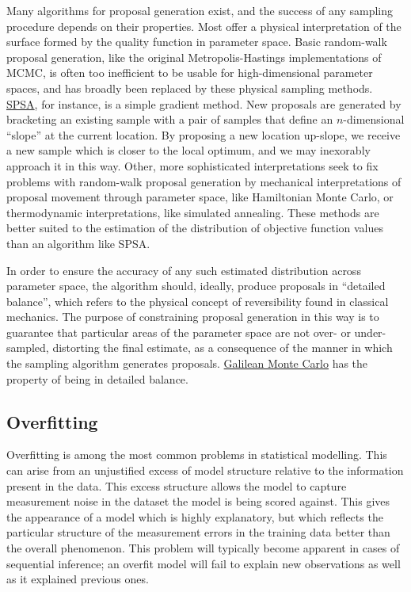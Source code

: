 Many algorithms for proposal generation exist, and the success of any sampling procedure depends on their properties. Most offer a physical interpretation of the surface formed by the quality function in parameter space. Basic random-walk proposal generation, like the original Metropolis-Hastings implementations of MCMC, is often too inefficient to be usable for high-dimensional parameter spaces, and has broadly been replaced by these physical sampling methods. \hyperref[ssec:SPSA]{SPSA}, for instance, is a simple gradient method. New proposals are generated by bracketing an existing sample with a pair of samples that define an $n$-dimensional ``slope'' at the current location. By proposing a new location up-slope, we receive a new sample which is closer to the local optimum, and we may inexorably approach it in this way. Other, more sophisticated interpretations seek to fix problems with random-walk proposal generation by mechanical interpretations of proposal movement through parameter space, like Hamiltonian Monte Carlo, or thermodynamic interpretations, like simulated annealing. These methods are better suited to the estimation of the distribution of objective function values than an algorithm like SPSA.

In order to ensure the accuracy of any such estimated distribution across parameter space, the algorithm should, ideally, produce proposals in ``detailed balance'', which refers to the physical concept of reversibility found in classical mechanics. The purpose of constraining proposal generation in this way is to guarantee that particular areas of the parameter space are not over- or under-sampled, distorting the final estimate, as a consequence of the manner in which the sampling algorithm generates proposals. \hyperref[ssec:GMC]{Galilean Monte Carlo} has the property of being in detailed balance.

\subsection{Overfitting}
\label{ssec:overfit}
Overfitting is among the most common problems in statistical modelling. This can arise from an unjustified excess of model structure relative to the information present in the data. This excess structure allows the model to capture measurement noise in the dataset the model is being scored against. This gives the appearance of a model which is highly explanatory, but which reflects the particular structure of the measurement errors in the training data better than the overall phenomenon. This problem will typically become apparent in cases of sequential inference; an overfit model will fail to explain new observations as well as it explained previous ones.

